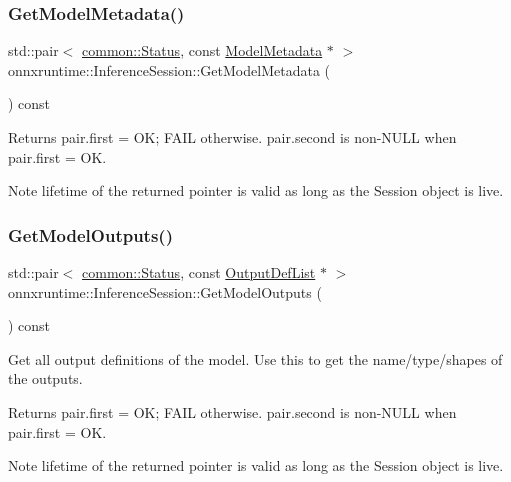 \subsubsection{\texorpdfstring{Get\+Model\+Metadata()}{GetModelMetadata()}}
{\footnotesize\ttfamily std\+::pair$<$ \mbox{\hyperlink{classonnxruntime_1_1common_1_1Status}{common\+::\+Status}}, const \mbox{\hyperlink{structonnxruntime_1_1ModelMetadata}{Model\+Metadata}} $\ast$ $>$ onnxruntime\+::\+Inference\+Session\+::\+Get\+Model\+Metadata (\begin{DoxyParamCaption}{ }\end{DoxyParamCaption}) const}

\begin{DoxyReturn}{Returns}
pair.\+first = OK; F\+A\+IL otherwise. pair.\+second is non-\/\+N\+U\+LL when pair.\+first = OK. 
\end{DoxyReturn}
\begin{DoxyNote}{Note}
lifetime of the returned pointer is valid as long as the Session object is live. 
\end{DoxyNote}
\mbox{\label{classonnxruntime_1_1InferenceSession_a7a705fa4164dc161e76a7641820fe65a}} 
\subsubsection{\texorpdfstring{Get\+Model\+Outputs()}{GetModelOutputs()}}
{\footnotesize\ttfamily std\+::pair$<$ \mbox{\hyperlink{classonnxruntime_1_1common_1_1Status}{common\+::\+Status}}, const \mbox{\hyperlink{namespaceonnxruntime_a4b3c292f33b95d038b5059f6103f287a}{Output\+Def\+List}} $\ast$ $>$ onnxruntime\+::\+Inference\+Session\+::\+Get\+Model\+Outputs (\begin{DoxyParamCaption}{ }\end{DoxyParamCaption}) const}

Get all output definitions of the model. Use this to get the name/type/shapes of the outputs. \begin{DoxyReturn}{Returns}
pair.\+first = OK; F\+A\+IL otherwise. pair.\+second is non-\/\+N\+U\+LL when pair.\+first = OK. 
\end{DoxyReturn}
\begin{DoxyNote}{Note}
lifetime of the returned pointer is valid as long as the Session object is live. 
\end{DoxyNote}
\mbox{\label{classonnxruntime_1_1InferenceSession_aef2b179e956c7450ccf22d0be3374b6e}} 
